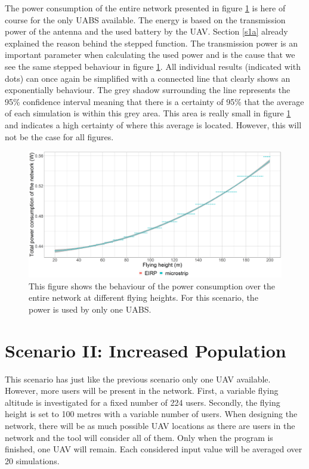 The power consumption of the entire network presented in figure \ref{fig:fhvspc} is here of course for the only \gls{UABS} available.
The energy is based on the transmission power of the antenna and the used battery by the \gls{UAV}.
Section \ref{s1a} already explained the reason behind the stepped function. The transmission power 
is an important parameter when calculating the used power and is the cause that we see the same stepped behaviour in 
figure \ref{fig:fhvspc}. All individual results (indicated with dots) can once again be simplified 
with a connected line that clearly shows an exponentially behaviour. The grey shadow 
surrounding the line represents the 95\% confidence interval meaning that there is 
a certainty of 95\% that the average of each simulation is within this grey area. 
This area is really small 
in figure \ref{fig:fhvspc} and indicates a high certainty of where this average is located.
However, this will not be the case for all figures.

\begin{figure}[h!]
  \centering
  \includegraphics[width=\textwidth]{../results/s1/fhvspc.png}
  \caption{This figure shows the behaviour of the power consumption over the entire network at different flying  heights.
  For this scenario, the power is used by only one \acs{UABS}.}
  \label{fig:fhvspc}
\end{figure}
\FloatBarrier
\section{Scenario II: Increased Population}

This scenario has just like the previous scenario only one \gls{UAV} available. However, more users will be present in the network.
First, a variable flying altitude is investigated for a fixed number of 224 users. 
Secondly, the flying height is set to 100 metres with a variable number of users.
When designing the network, there will be as much possible \gls{UAV} locations as there are users in the network and the tool
will consider all of them. Only when the program is finished, one \gls{UAV} will remain.
Each considered input value will be averaged over 20 simulations.



